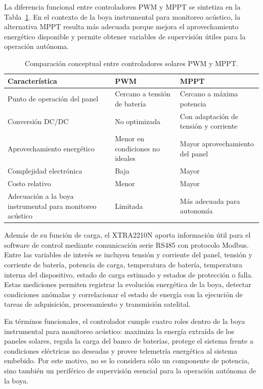 La diferencia funcional entre controladores PWM y MPPT se sintetiza en la Tabla~\ref{tab:pwm-mppt}. En el contexto de la boya instrumental para monitoreo acústico, la alternativa MPPT resulta más adecuada porque mejora el aprovechamiento energético disponible y permite obtener variables de supervisión útiles para la operación autónoma.

\begin{table}[htbp]
    \centering
    \caption{Comparación conceptual entre controladores solares PWM y MPPT.}
    \label{tab:pwm-mppt}
    \begin{tabular}{lll}
        \hline
        \textbf{Característica} & \textbf{PWM} & \textbf{MPPT} \\
        \hline
        Punto de operación del panel & Cercano a tensión de batería & Cercano a máxima potencia \\
        Conversión DC/DC & No optimizada & Con adaptación de tensión y corriente \\
        Aprovechamiento energético & Menor en condiciones no ideales & Mayor aprovechamiento del panel \\
        Complejidad electrónica & Baja & Mayor \\
        Costo relativo & Menor & Mayor \\
        Adecuación a la boya instrumental para monitoreo acústico & Limitada & Más adecuada para autonomía \\
        \hline
    \end{tabular}
\end{table}

Además de su función de carga, el XTRA2210N aporta información útil para el software de control mediante comunicación serie RS485 con protocolo Modbus. Entre las variables de interés se incluyen tensión y corriente del panel, tensión y corriente de batería, potencia de carga, temperatura de batería, temperatura interna del dispositivo, estado de carga estimado y estados de protección o falla. Estas mediciones permiten registrar la evolución energética de la boya, detectar condiciones anómalas y correlacionar el estado de energía con la ejecución de tareas de adquisición, procesamiento y transmisión satelital.

En términos funcionales, el controlador cumple cuatro roles dentro de la boya instrumental para monitoreo acústico: maximiza la energía extraída de los paneles solares, regula la carga del banco de baterías, protege el sistema frente a condiciones eléctricas no deseadas y provee telemetría energética al sistema embebido. Por este motivo, no se lo considera sólo un componente de potencia, sino también un periférico de supervisión esencial para la operación autónoma de la boya.


